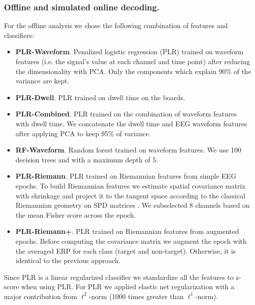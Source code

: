 \documentclass[12pt]{iopart}
\begin{document}
\subsubsection*{Offline and simulated online decoding.}
For the offline analysis we chose the following combination of features and classifiers:
\begin{itemize}
    \item \textbf{PLR-Waveform}. Penalized logistic regression (PLR) trained on waveform features (i.e. the signal's
        value at each channel and time point) after reducing
        the dimensionality with PCA. Only the components which explain 90\% of the variance
        are kept. 
    \item \textbf{PLR-Dwell}. PLR trained on dwell time on the boards.
    \item \textbf{PLR-Combined}. PLR trained on the combination of waveform features with dwell time. We concatenate
        the dwell time and EEG waveform features after applying PCA to keep 95\% of variance. 

    \item \textbf{RF-Waveform}. Random forest trained on waveform features. We use 100 decision trees and
        with a maximum depth of 5.
    \item \textbf{PLR-Riemann}. PLR trained on Riemannian features from simple EEG epochs.
        To build Riemannian features we
        estimate spatial covariance matrix with shrinkage and project it
        to the tangent space according to the classical Riemannian geometry on SPD matrices
        \cite{barachant_multiclass_2012}.
        We subselected 8 channels based on the mean Fisher score across the epoch.
    \item \textbf{PLR-Riemann+}. PLR trained on Riemannian features from augmented epochs.
        Before computing the covariance matrix we augment the epoch with the averaged ERP
        for each class (target and non-target). Otherwise, it is identical to the previous
        approach.
\end{itemize}

Since PLR is a linear regularized classifier 
we standardize all the features to z-score when
using PLR. For PLR we applied elastic net regularization
with a major contribution from $\ell^2$-norm (1000 times greater than $\ell^1$-norm).
\end{document}
